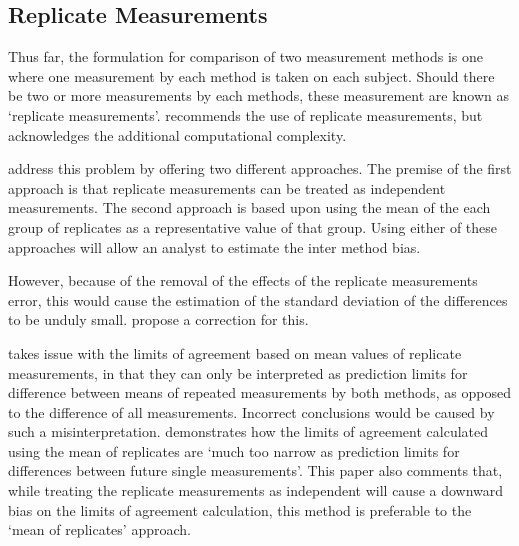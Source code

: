 \documentclass[12pt, a4paper]{report}
\theoremstyle{plain}
\theoremstyle{definition}
\theoremstyle{remark}
\begin{document}
	
	
	
	
	
	\subsection{Replicate Measurements}
	
	Thus far, the formulation for comparison of two measurement methods is one where one measurement by each method is taken on	each subject. Should there be two or more measurements by each methods, these measurement are known as `replicate measurements'.
	\citet{BXC2008} recommends the use of replicate measurements, but acknowledges the additional computational complexity.
	
	\citet*{BA86} address this problem by offering two different approaches. The premise of the first approach is that replicate
	measurements can be treated as independent measurements. The second approach is based upon using the mean of the each group of
	replicates as a representative value of that group. Using either
	of these approaches will allow an analyst to estimate the inter
	method bias.
	
	
	However, because of the removal of the effects of the replicate
	measurements error, this would cause the estimation of the
	standard deviation of the differences to be unduly small.
	\citet*{BA86} propose a correction for this.
	
	\citet{BXC2008} takes issue with the limits of agreement based on
	mean values of replicate measurements, in that they can only be interpreted as prediction
	limits for difference between means of repeated measurements by
	both methods, as opposed to the difference of all measurements.
	Incorrect conclusions would be caused by such a misinterpretation.
	\citet{BXC2008} demonstrates how the limits of agreement
	calculated using the mean of replicates are `much too narrow as
	prediction limits for differences between future single
	measurements'. This paper also comments that, while treating the
	replicate measurements as independent will cause a downward bias
	on the limits of agreement calculation, this method is preferable
	to the `mean of replicates' approach.
	
	
	
\end{document}
